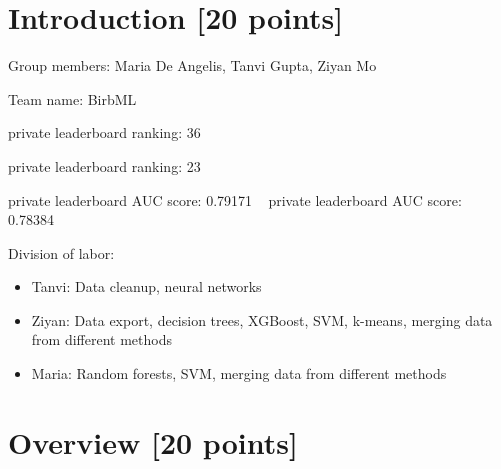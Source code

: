 \newif\ifshowsolutions
\showsolutionstrue







\pagestyle{fancy}




\newpage

\section{Introduction [20 points]}

\vspace{2ex}

\noindent
Group members: Maria De Angelis, Tanvi Gupta, Ziyan Mo

\noindent
Team name: BirbML

 private leaderboard ranking: 36

 private leaderboard ranking: 23

 private leaderboard AUC score: 0.79171
\
 private leaderboard AUC score: 0.78384

\noindent
Division of labor:
\begin{itemize}
\item Tanvi: Data cleanup, neural networks
\item Ziyan: Data export, decision trees, XGBoost, SVM, k-means, merging data from different methods
\item Maria: Random forests, SVM, merging data from different methods
\end{itemize}

\newpage

\section{Overview [20 points]}

\vspace{2ex}

